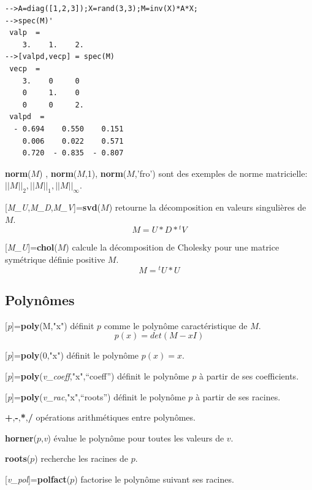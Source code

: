 \documentclass{article}
\begin{document}
\begin{multicols}{3}
\begin{description}
\begin{verbatim}
-->A=diag([1,2,3]);X=rand(3,3);M=inv(X)*A*X;
-->spec(M)'
 valp  =
    3.    1.    2.  
-->[valpd,vecp] = spec(M)
 vecp  =
    3.    0     0   
    0     1.    0   
    0     0     2.  
 valpd  =
  - 0.694    0.550    0.151  
    0.006    0.022    0.571  
    0.720  - 0.835  - 0.807
\end{verbatim}
\item{\textbf{norm}($M$) , \textbf{norm}($M$,1), \textbf{norm}($M$,'fro')} sont des exemples de norme matricielle: $||M||_{2},||M||_{1},||M||_{\infty}$.
\item{[\textit{M\_U},\textit{M\_D},\textit{M\_V}]=\textbf{svd}($M$)} retourne la décomposition en valeurs singulières de $M$.
$$M = U * D * {}^{t}V$$
\item{[\textit{M\_U}]=\textbf{chol}($M$)} calcule la décomposition de Cholesky pour une matrice symétrique définie positive $M$.
$$M = {}^{t}U * U$$
\end{description}

\subsection{Polynômes}
\begin{description}
\item{[\textit{p}]=\textbf{poly}(M,"x")} définit $p$ comme le polynôme caractéristique de $M$.
$$p(x) = det(M - xI)$$
\item{[\textit{p}]=\textbf{poly}(0,"x")} définit le polynôme $p(x)=x$.
\item{[\textit{p}]=\textbf{poly}(\textit{v\_coeff},"x",``coeff'')} définit le polynôme $p$ à partir de ses coefficients.
\item{[\textit{p}]=\textbf{poly}(\textit{v\_rac},"x",``roots'')} définit le polynôme $p$ à partir de ses racines.
\item{\textbf{+},\textbf{-},\textbf{*},\textbf{/}} opérations arithmétiques entre polynômes.
\item{\textbf{horner}($p$,\textit{v})} évalue le polynôme pour toutes les valeurs de $v$.
\item{\textbf{roots}($p$)} recherche les racines de $p$.
\item{[\textit{v\_pol}]=\textbf{polfact}($p$)} factorise le polynôme suivant ses racines.
\end{description}




\end{multicols}
\end{document}
